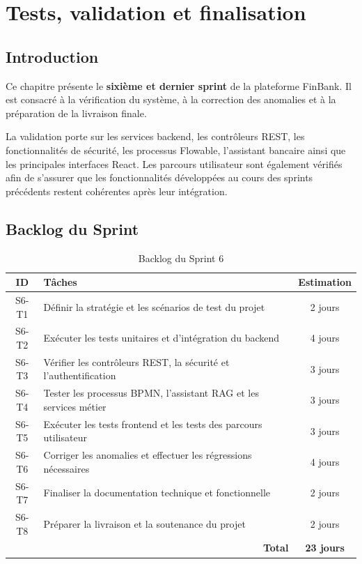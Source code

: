 \chapter{Tests, validation et finalisation}
\label{chap:sprint6}

\section{Introduction}
\label{sec:intro_sprint6}

Ce chapitre présente le \textbf{sixième et dernier sprint} de la
plateforme FinBank. Il est consacré à la vérification du système, à la
correction des anomalies et à la préparation de la livraison finale.

La validation porte sur les services backend, les contrôleurs REST, les
fonctionnalités de sécurité, les processus Flowable, l'assistant
bancaire ainsi que les principales interfaces React. Les parcours
utilisateur sont également vérifiés afin de s'assurer que les
fonctionnalités développées au cours des sprints précédents restent
cohérentes après leur intégration.

\section{Backlog du Sprint}
\label{sec:backlog_sprint6}

\begin{table}[htbp]
\centering
\caption{Backlog du Sprint 6}
\label{tab:backlog_sprint6}
\renewcommand{\arraystretch}{1.3}
\begin{tabular}{|c|p{10cm}|c|}
\hline
\textbf{ID} & \textbf{Tâches} & \textbf{Estimation} \\
\hline
S6-T1 & Définir la stratégie et les scénarios de test du projet & 2 jours \\
\hline
S6-T2 & Exécuter les tests unitaires et d'intégration du backend & 4 jours \\
\hline
S6-T3 & Vérifier les contrôleurs REST, la sécurité et l'authentification & 3 jours \\
\hline
S6-T4 & Tester les processus BPMN, l'assistant RAG et les services métier & 3 jours \\
\hline
S6-T5 & Exécuter les tests frontend et les tests des parcours utilisateur & 3 jours \\
\hline
S6-T6 & Corriger les anomalies et effectuer les régressions nécessaires & 4 jours \\
\hline
S6-T7 & Finaliser la documentation technique et fonctionnelle & 2 jours \\
\hline
S6-T8 & Préparer la livraison et la soutenance du projet & 2 jours \\
\hline
\multicolumn{2}{|r|}{\textbf{Total}} & \textbf{23 jours} \\
\hline
\end{tabular}
\end{table}

